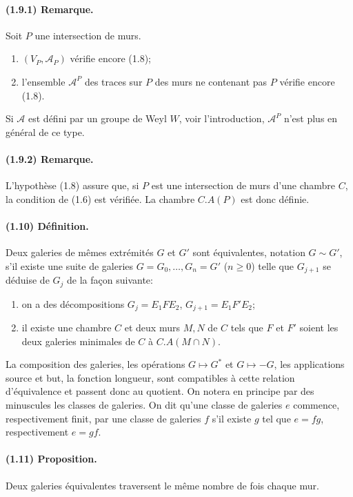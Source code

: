 \documentclass[10pt]{article}
\newcommand{\mcA}{\mathcal A}
\begin{document}
\paragraph{(1.9.1) Remarque.} Soit $P$ une intersection de murs.
\begin{enumerate}[label=(\roman*)]
\item $(V_P,\mcA_P)$ vérifie encore (1.8);
\item l'ensemble $\mcA^P$ des traces sur $P$ des murs ne contenant pas $P$ vérifie encore (1.8).
\end{enumerate}
Si $\mcA$ est défini par un groupe de Weyl $W$, voir l'introduction, $\mcA^P$ n'est plus en général de ce type.

\paragraph{(1.9.2) Remarque.} L'hypothèse (1.8) assure que, si $P$ est une intersection de murs d'une chambre $C$, la condition de (1.6) est vérifiée. La chambre $C.A(P)$ est donc définie.

\paragraph{(1.10) Définition.} Deux galeries de mêmes extrémités $G$ et $G'$ sont équivalentes, notation $G\sim G'$, s'il existe une suite de galeries $G=G_0,\ldots,G_n=G'$ ($n\ge0$) telle que $G_{j+1}$ se déduise de $G_j$ de la façon suivante:
\begin{enumerate}[label=\alph*)]
\item on a des décompositions $G_j=E_1FE_2$, $G_{j+1}=E_1F'E_2$;
\item il existe une chambre $C$ et deux murs $M,N$ de $C$ tels que $F$ et $F'$ soient les deux galeries minimales de $C$ à $C.A(M\cap N)$.
\end{enumerate}
La composition des galeries, les opérations $G\mapsto G^*$ et $G\mapsto -G$, les applications source et but, la fonction longueur, sont compatibles à cette relation d'équivalence et passent donc au quotient. On notera en principe par des minuscules les classes de galeries. On dit qu'une classe de galeries $e$ commence, respectivement finit, par une classe de galeries $f$ s'il existe $g$ tel que $e=fg$, respectivement $e=gf$.

\paragraph{(1.11) Proposition.} Deux galeries équivalentes traversent le même nombre de fois chaque mur.
\end{document}
